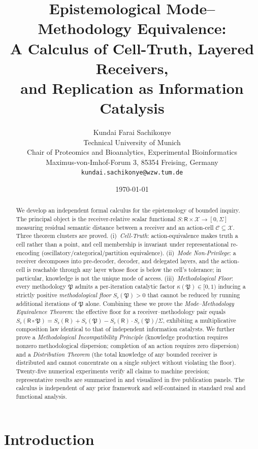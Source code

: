 \documentclass[twocolumn,11pt,a4paper]{article}
\title{\textbf{Epistemological Mode--Methodology Equivalence:\\
A Calculus of Cell-Truth, Layered Receivers,\\
and Replication as Information Catalysis}}
\author{Kundai Farai Sachikonye\\[2pt]
\small Technical University of Munich \\
\small Chair of Proteomics and Bioanalytics, Experimental Bioinformatics\\
\small Maximus-von-Imhof-Forum 3, 85354 Freising, Germany\\
\small \texttt{kundai.sachikonye@wzw.tum.de}}
\date{\today}
\newcommand{\X}{\mathcal{X}}
\newcommand{\Cell}{\mathcal{C}}
\newcommand{\Method}{\mathfrak{P}}
\newcommand{\receiver}{\mathsf{R}}
\newcommand{\Sfloor}{S_{\flat}}
\begin{document}
\maketitle

\begin{abstract}
We develop an independent formal calculus for the epistemology of bounded
inquiry. The principal object is the receiver-relative scalar functional
$S:\receiver\times\X\to[0,\Sigma]$ measuring residual semantic distance between
a receiver and an action-cell $\Cell\subseteq\X$. Three theorem clusters are
proved. (i)~\emph{Cell-Truth}: action-equivalence makes truth a cell rather
than a point, and cell membership is invariant under representational
re-encoding (oscillatory/categorical/partition equivalence). (ii)~\emph{Mode
Non-Privilege}: a receiver decomposes into pre-decoder, decoder, and
delegated layers, and the action-cell is reachable through any layer whose
floor is below the cell's tolerance; in particular, knowledge is not the
unique mode of access. (iii)~\emph{Methodological Floor}: every methodology
$\Method$ admits a per-iteration catalytic factor
$\kappa(\Method)\in[0,1)$ inducing a strictly positive
\emph{methodological floor} $\Sfloor(\Method)>0$ that cannot be reduced by
running additional iterations of $\Method$ alone. Combining these we prove
the \emph{Mode--Methodology Equivalence Theorem}: the effective floor for a
receiver--methodology pair equals
$\Sfloor(\receiver\circ\Method)=\Sfloor(\receiver)+\Sfloor(\Method)
-\Sfloor(\receiver)\cdot\Sfloor(\Method)/\Sigma$,
exhibiting a multiplicative composition law identical to that of independent
information catalysts. We further prove a \emph{Methodological Incompatibility
Principle} (knowledge production requires nonzero methodological dispersion;
completion of an action requires zero dispersion) and a
\emph{Distribution Theorem} (the total knowledge of any bounded receiver is
distributed and cannot concentrate on a single subject without violating the
floor). Twenty-five numerical experiments verify all claims to machine
precision; representative results are summarized in
 and visualized in five publication panels. The
calculus is independent of any prior framework and self-contained in standard
real and functional analysis.
\end{abstract}

\tableofcontents

\section{Introduction}
\label{sec:introduction}
\end{document}
